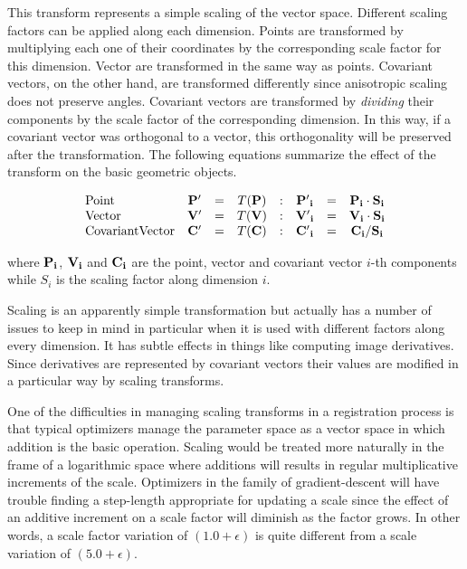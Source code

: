 This transform represents a simple scaling of the vector space.  Different
scaling factors can be applied along each dimension. Points are transformed by
multiplying each one of their coordinates by the  corresponding scale factor
for this dimension.  Vector are transformed in the same way as points.
Covariant vectors, on the other hand, are transformed differently since
anisotropic scaling does not preserve angles. Covariant vectors are transformed
by \emph{dividing} their components by the scale factor of the corresponding
dimension. In this way, if a covariant vector was orthogonal to a vector, this
orthogonality will be preserved after the transformation. The following
equations summarize the effect of the transform on the basic geometric objects.

\begin{equation}
\begin{array}{lccccccc}
\mbox{Point }          & \bf{P'} &  =  & T(\bf{P})  & : & \bf{P'}_i &  = & \bf{P}_i \cdot S_i \\
\mbox{Vector}          & \bf{V'} &  =  & T(\bf{V})  & : & \bf{V'}_i &  = & \bf{V}_i \cdot S_i \\
\mbox{CovariantVector} & \bf{C'} &  =  & T(\bf{C})  & : & \bf{C'}_i &  = & \bf{C}_i /     S_i \\
\end{array}
\end{equation}

where $\bf{P}_i$, $\bf{V}_i$ and $\bf{C}_i$ are the point, vector and covariant
vector $i$-th components while $S_i$ is the scaling factor along dimension
$i$.  

Scaling is an apparently simple transformation but actually has a number of
issues to keep in mind in particular when it is used with different factors
along every dimension. It has subtle effects in things like computing image
derivatives. Since derivatives are represented by covariant vectors their
values are modified in a particular way by scaling transforms.

One of the difficulties in managing scaling transforms in a registration
process is that typical optimizers manage the parameter space as a vector space
in which addition is the basic operation. Scaling would be treated more
naturally in the frame of a logarithmic space where additions will results in
regular multiplicative increments of the scale. Optimizers in the family of
gradient-descent will have trouble finding a step-length appropriate for
updating a scale since the effect of an additive increment on a scale factor
will diminish as the factor grows. In other words, a scale factor variation of
$(1.0+ \epsilon)$ is quite different from a scale variation of $(5.0+\epsilon)$.

